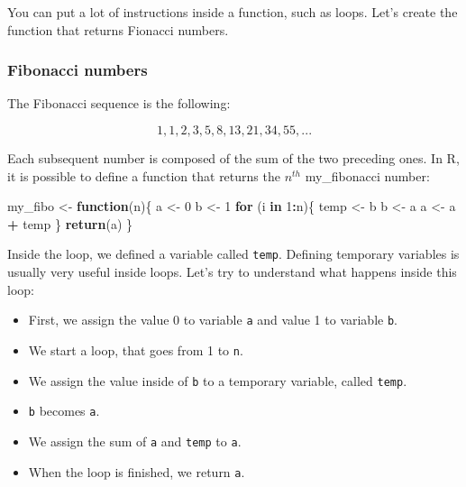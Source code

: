 \documentclass[]{gitbook}
\newenvironment{Shaded}{\begin{snugshade}}{\end{snugshade}}
\newcommand{\ControlFlowTok}[1]{\textcolor[rgb]{0.13,0.29,0.53}{\textbf{#1}}}
\newcommand{\DecValTok}[1]{\textcolor[rgb]{0.00,0.00,0.81}{#1}}
\newcommand{\KeywordTok}[1]{\textcolor[rgb]{0.13,0.29,0.53}{\textbf{#1}}}
\newcommand{\NormalTok}[1]{#1}
\newcommand{\OperatorTok}[1]{\textcolor[rgb]{0.81,0.36,0.00}{\textbf{#1}}}
\newcommand{\StringTok}[1]{\textcolor[rgb]{0.31,0.60,0.02}{#1}}
\providecommand{\tightlist}{%
  \setlength{\itemsep}{0pt}\setlength{\parskip}{0pt}}
\begin{document}
You can put a lot of instructions inside a function, such as loops. Let's create the function that
returns Fionacci numbers.

\hypertarget{fibonacci-numbers}{%
\subsubsection{Fibonacci numbers}\label{fibonacci-numbers}}

The Fibonacci sequence is the following:

\[1, 1, 2, 3, 5, 8, 13, 21, 34, 55, ...\]

Each subsequent number is composed of the sum of the two preceding ones. In R, it is possible to define a function that returns the \(n^{th}\) my\_fibonacci number:

\begin{Shaded}
\begin{Highlighting}[]
\NormalTok{my_fibo <-}\StringTok{ }\ControlFlowTok{function}\NormalTok{(n)\{}
\NormalTok{ a <-}\StringTok{ }\DecValTok{0}
\NormalTok{ b <-}\StringTok{ }\DecValTok{1}
 \ControlFlowTok{for}\NormalTok{ (i }\ControlFlowTok{in} \DecValTok{1}\OperatorTok{:}\NormalTok{n)\{}
\NormalTok{  temp <-}\StringTok{ }\NormalTok{b}
\NormalTok{  b <-}\StringTok{ }\NormalTok{a}
\NormalTok{  a <-}\StringTok{ }\NormalTok{a }\OperatorTok{+}\StringTok{ }\NormalTok{temp}
\NormalTok{ \}}
 \KeywordTok{return}\NormalTok{(a)}
\NormalTok{\}}
\end{Highlighting}
\end{Shaded}

Inside the loop, we defined a variable called \texttt{temp}. Defining temporary variables is usually very
useful inside loops. Let's try to understand what happens inside this loop:

\begin{itemize}
\tightlist
\item
  First, we assign the value 0 to variable \texttt{a} and value 1 to variable \texttt{b}.
\item
  We start a loop, that goes from 1 to \texttt{n}.
\item
  We assign the value inside of \texttt{b} to a temporary variable, called \texttt{temp}.
\item
  \texttt{b} becomes \texttt{a}.
\item
  We assign the sum of \texttt{a} and \texttt{temp} to \texttt{a}.
\item
  When the loop is finished, we return \texttt{a}.
\end{itemize}
\end{document}
